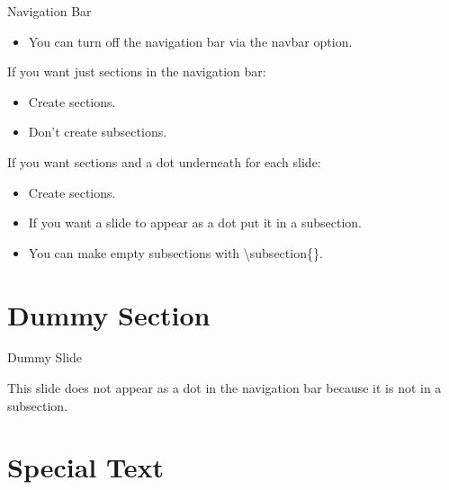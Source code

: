 \documentclass[serif]{beamer}
\begin{document}
\begin{frame}{Navigation Bar}

\begin{itemize}
\item You can turn off the navigation bar via the navbar option.
\end{itemize}

\begin{block}{If you want just sections in the navigation bar:}
\begin{itemize}
\item Create sections.
\item Don't create subsections.
\end{itemize}
\end{block}

\begin{block}{If you want sections and a dot underneath for each slide:}
\begin{itemize}
\item Create sections.
\item If you want a slide to appear as a dot put it in a subsection.
\item You can make empty subsections with \textbackslash subsection\{\}.
\end{itemize}
\end{block}

\end{frame}


\section{Dummy Section}

\begin{frame}{Dummy Slide}

This slide does not appear as a dot in the navigation bar because it is not in a subsection.

\end{frame}


\section{Special Text}
\subsection{}
\end{document}
